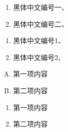 \begin{enumerate}[label=\heiti\chinese*、]
	\item 黑体中文编号一、
	\item 黑体中文编号二、
\end{enumerate}

\begin{enumerate}[label=\heiti\arabic*、]
	\item 黑体中文编号1、
	\item 黑体中文编号2、
\end{enumerate}

\begin{enumerate}[A.]
	\item 第一项内容
	\item 第二项内容
\end{enumerate}

\begin{enumerate}[\heiti a.]
	\item 第一项内容
	\item 第二项内容
\end{enumerate}